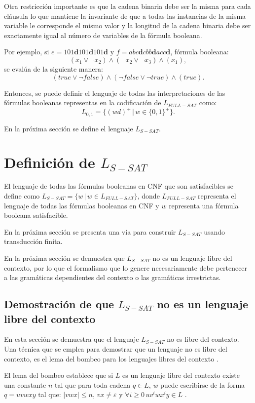\documentclass[12pt]{article}
\begin{document}
Otra restricción importante es que la cadena
binaria debe ser la misma para cada cláusula lo que mantiene la invariante de que a todas las instancias de la misma
variable le corresponde el mismo valor y la longitud de la cadena binaria debe ser exactamente igual al número de 
variables de la fórmula booleana.

Por ejemplo, si $e=101\mathbf{d}101\mathbf{d}101\mathbf{d}$ y $f=abc\mathbf{d}cbb\mathbf{d}acc\mathbf{d}$, fórmula booleana:
$$(x_1\vee\neg x_2)\wedge (\neg x_2 \vee \neg x_3)\wedge (x_1),$$
se evalúa de la siguiente manera:
$$(true\vee\neg false)\wedge (\neg false \vee \neg true)\wedge (true).$$

Entonces, se puede definir el lenguaje de todas las interpretaciones de las fórmulas booleanas representas en la codificación
de $L_{FULL-SAT}$ como:
$$L_{0,1}=\{(wd)^+\,|\,w\in\{0,1\}^+\}.$$

En la próxima sección se define el lenguaje $L_{S-SAT}$.

\section{Definición de $L_{S-SAT}$}

El lenguaje de todas las fórmulas booleanas en CNF que son satisfacibles se define como $L_{S-SAT}=\{w\,|\,w \in L_{FULL-SAT} \}$, 
donde $L_{FULL-SAT}$ representa el lenguaje de todas las fórmulas booleanas en CNF y $w$ representa una fórmula booleana satisfacible.

En la próxima sección se presenta una vía para construir $L_{S-SAT}$ usando transducción finita.

En la próxima sección se demuestra que $L_{S-SAT}$ no es un lenguaje libre del contexto, por lo que el formalismo que lo
genere necesariamente debe pertenecer a las gramáticas dependientes del contexto o las gramáticas irrestrictas.

\subsection{Demostración de que $L_{S-SAT}$ no es un lenguaje libre del contexto}

En esta sección se demuestra que el lenguaje $L_{S-SAT}$ no es libre del contexto. Una técnica que se emplea para demostrar que un lenguaje no es libre del contexto, es el lema del bombeo para los lenguajes
libres del contexto \cite{authomataTheory}. 

El lema del bombeo establece que si $L$ es un lenguaje libre del contexto
existe una constante $n$ tal que para toda cadena $q\in L$, $w$ puede escribirse de la forma $q=uvwxy$ tal que:
$|vwx|\leq n$, $vx\neq \varepsilon$ y $\forall i\geq 0\,uv^iwx^iy\in L$ \cite{authomataTheory}.
\end{document}
